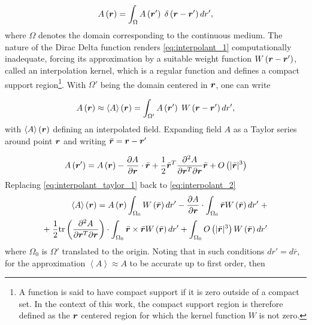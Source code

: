 %
\begin{equation} \label{eq:interpolant_1}
A\left( {\boldsymbol{r}} \right) = \int_\Omega  {A\left( {{\boldsymbol{r}}'} \right)\; \delta \left( {{\boldsymbol{r}} - {\boldsymbol{r}}'} \right)d{{r}}'},
\end{equation}
%
where $\Omega$ denotes the domain corresponding to the continuous medium. The nature of the Dirac Delta function renders \eqref{eq:interpolant_1} computationally inadequate, forcing its approximation by a suitable weight function $W\left( {{\boldsymbol{r}} - {\boldsymbol{r}}'} \right)$, called an interpolation kernel, which is a regular function and defines a compact support region\footnote{A function is said to have compact support if it is zero outside of a compact set. In the context of this work, the compact support region is therefore defined as the $\boldsymbol{r}$ centered region for which the kernel function $W$ is not zero.}. With $\Omega'$ being the domain centered in $\boldsymbol{r}$, one can write

% 
\begin{equation} \label{eq:interpolant_2}
A\left( {\boldsymbol{r}} \right) \approx  \left\langle {A} \right\rangle \left( {\boldsymbol{r}} \right) = \int_{\Omega '}  {A\left( {\boldsymbol{r}'} \right)\; W \left( {{\boldsymbol{r}} - {\boldsymbol{r}}'} \right)d{{r}}'},
\end{equation}
%
with $\left\langle {A} \right\rangle \left( {\boldsymbol{r}} \right)$ defining an interpolated field. Expanding field $A$ as a Taylor series around point $\boldsymbol{r}$ and writing $\bar{\boldsymbol{r}}=\boldsymbol{r}-\boldsymbol{r}'$

% 
\begin{equation} \label{eq:interpolant_taylor_1}
A\left( {\boldsymbol{r}'} \right) = A\left( {\boldsymbol{r}} \right) - \frac{\partial A}{\partial \boldsymbol{r}}\cdot \bar{\boldsymbol{r}} + \frac{1}{2}\bar{\boldsymbol{r}}^T \frac{\partial^2 A}{\partial \boldsymbol{r}^T \partial \boldsymbol{r}} \bar{\boldsymbol{r}} + O\left( |\bar{\boldsymbol{r}}|^3 \right)
\end{equation}
%
Replacing \eqref{eq:interpolant_taylor_1} back to \eqref{eq:interpolant_2}
% 
\begin{equation} \label{eq:interpolant_taylor_2}
\begin{split}
\left\langle {A} \right\rangle \left( {\boldsymbol{r}} \right) = A\left( {\boldsymbol{r}} \right) \int_{\Omega_0} {W \left( {\bar{\boldsymbol{r}}} \right)d{{r}}'} - \frac{\partial A}{\partial \boldsymbol{r}} \cdot \int_{\Omega_0} {\bar{\boldsymbol{r}} W \left( {\bar{\boldsymbol{r}}} \right)d{{r}}'} \; + \\ +\; \frac{1}{2} \text{tr}\left(\frac{\partial^2 A}{\partial \boldsymbol{r}^T \partial \boldsymbol{r}}\right) \cdot \int_{\Omega_0} {\bar{\boldsymbol{r}} \times \bar{\boldsymbol{r}} W \left( {\bar{\boldsymbol{r}}} \right)d{{r}}'} + \int_{\Omega_0} {O\left( |\bar{\boldsymbol{r}}|^3 \right) W \left( {\bar{\boldsymbol{r}}} \right)d{{r}}'}
\end{split}
\end{equation}
%
where $\Omega_0$ is $\Omega'$ translated to the origin. Noting that in such conditions $d{{r}'}=d\bar{{r}}$, for the approximation $\left\langle {A} \right\rangle \approx A$ to be accurate up to first order, then

